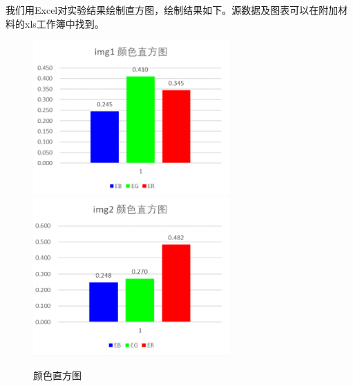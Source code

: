 \documentclass{article}
\begin{document}
我们用Excel对实验结果绘制直方图，绘制结果如下。源数据及图表可以在附加材料的xls工作簿中找到。

\begin{figure}[htb]
\centering
\includegraphics[width=7.5cm]{img/1-1.png}
\includegraphics[width=7.5cm]{img/1-2.png}
\caption{颜色直方图}
\label{1}
\end{figure}
\end{document}
